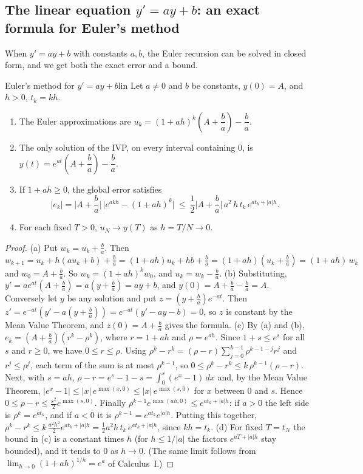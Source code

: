\documentclass[11pt]{article}
\begin{document}
\subsection*{The linear equation $y'=ay+b$: an exact formula for Euler's method}

When $y'=ay+b$ with constants $a,b$, the Euler recursion can be solved in closed form, and we get both the exact error and a bound.

\begin{thm}{Euler's method for $y'=ay+b$}{lin}
Let $a\ne0$ and $b$ be constants, $y(0)=A$, and $h>0$, $t_k=kh$.
\begin{enumerate}[label=(\alph*),nosep]
  \item The Euler approximations are $u_k=(1+ah)^k\left(A+\dfrac ba\right)-\dfrac ba$.
  \item The only solution of the IVP, on every interval containing $0$, is $y(t)=e^{at}\left(A+\dfrac ba\right)-\dfrac ba$.
  \item If $1+ah\ge0$, the global error satisfies
  \[
  \lvert e_k\rvert=\Big\lvert A+\frac ba\Big\rvert\,\big\lvert e^{akh}-(1+ah)^k\big\rvert\ \le\ \frac12\Big\lvert A+\frac ba\Big\rvert\,a^2\,h\,t_k\,e^{a t_k+\lvert a\rvert h}.
  \]
  \item For each fixed $T>0$, $u_N\to y(T)$ as $h=T/N\to0$.
\end{enumerate}
\end{thm}
\begin{proof}
(a) Put $w_k=u_k+\frac ba$. Then $w_{k+1}=u_k+h(au_k+b)+\frac ba=(1+ah)u_k+hb+\frac ba=(1+ah)\left(u_k+\frac ba\right)=(1+ah)\,w_k$ and $w_0=A+\frac ba$. So $w_k=(1+ah)^kw_0$, and $u_k=w_k-\frac ba$.
(b) Substituting, $y'=ae^{at}\left(A+\frac ba\right)=a\left(y+\frac ba\right)=ay+b$, and $y(0)=A+\frac ba-\frac ba=A$. Conversely let $y$ be any solution and put $z=\left(y+\frac ba\right)e^{-at}$. Then $z'=e^{-at}\left(y'-a\left(y+\frac ba\right)\right)=e^{-at}(y'-ay-b)=0$, so $z$ is constant by the Mean Value Theorem, and $z(0)=A+\frac ba$ gives the formula.
(c) By (a) and (b), $e_k=\left(A+\frac ba\right)\left(r^k-\rho^k\right)$, where $r=1+ah$ and $\rho=e^{ah}$. Since $1+s\le e^s$ for all $s$ and $r\ge0$, we have $0\le r\le\rho$. Using $\rho^k-r^k=(\rho-r)\sum_{j=0}^{k-1}\rho^{k-1-j}r^j$ and $r^j\le\rho^j$, each term of the sum is at most $\rho^{k-1}$, so $0\le\rho^k-r^k\le k\,\rho^{k-1}(\rho-r)$. Next, with $s=ah$, $\rho-r=e^s-1-s=\int_0^s(e^x-1)\,dx$ and, by the Mean Value Theorem, $\lvert e^x-1\rvert\le\lvert x\rvert\,e^{\max(x,0)}\le\lvert x\rvert\,e^{\max(s,0)}$ for $x$ between $0$ and $s$. Hence $0\le\rho-r\le\frac{s^2}2e^{\max(s,0)}$. Finally $\rho^{k-1}e^{\max(ah,0)}\le e^{a t_k+\lvert a\rvert h}$: if $a>0$ the left side is $\rho^k=e^{at_k}$, and if $a<0$ it is $\rho^{k-1}=e^{at_k}e^{\lvert a\rvert h}$. Putting this together, $\rho^k-r^k\le k\,\frac{a^2h^2}2e^{at_k+\lvert a\rvert h}=\frac12a^2h\,t_k\,e^{at_k+\lvert a\rvert h}$, since $kh=t_k$.
(d) For fixed $T=t_N$ the bound in (c) is a constant times $h$ (for $h\le1/\lvert a\rvert$ the factors $e^{aT+\lvert a\rvert h}$ stay bounded), and it tends to $0$ as $h\to0$. (The same limit follows from $\lim_{h\to0}(1+ah)^{1/h}=e^a$ of Calculus~I.)
\end{proof}
\end{document}
